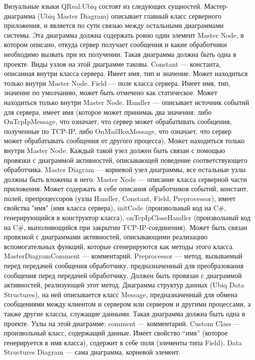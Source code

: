 Визуальные языки QReal:Ubiq состоят из следующих сущностей.
Мастер-диаграмма (Ubiq Master Diagram) описывает главный класс серверного приложения, и является по сути связью между остальными диаграммами системы. Эта диаграмма должна содержать ровно один элемент Master Node, в котором описано, откуда сервер получает сообщения и какие обработчики необходимо вызвать при их получении. Такая диаграмма должна быть одна в проекте. Виды узлов на этой диаграмме таковы.
Constant --- константа, описанная внутри класса сервера. Имеет имя, тип и значение. Может находиться только внутри Master Node.
Field --- поле класса сервера. Имеет имя, тип, значение по умолчанию, может быть отмечено как статическое. Может находиться только внутри Master Node.
Handler --- описывает источник событий для сервера, имеет имя (которое может принимаь два значения: либо OnTcpIpMessage, что означает, что сервер может обрабатывать сообщения, полученные по TCP-IP, либо OnMailBoxMessage, что означает, что сервер может обрабатывать сообщения от другого процесса). Может находиться только внутри Master Node. Каждый такой узел должен быть связан с помощью провязки с диаграммой активностей, описывающей поведение соответствующего обработчика.
Master Diagram --- корневой узел диаграммы, все остальные узлы должны быть вложены в него.
Master Node --- описание класса серверной части приложения. Может содержать в себе описания обработчиков событий, констант, полей, препроцессоров (узлы Handler, Constant, Field, Preprocessor), имеет свойства "имя" (имя класса сервера), initCode (произвольный код на C#, генерирующийся в конструктор класса), onTcpIpCloseHandler (произвольный код на C#, выполняющийся при закрытии TCP-IP-соединения). Может быть связан провязкой с диаграммами активностей, описывающими реализацию вспомогательных функций, которые сгенерируются как методы этого класса.
MasterDiagramComment --- комментарий.
Preprocessor --- метод, вызываемый перед передачей сообщения обработчику, предназначенный для преобразования сообщения перед передачей обработчику. Должен быть провязан с диаграммой активностей, реализующей этот метод.
Диаграмма структур данных (Ubiq Data Structures), на ней описывается класс Message, предназначенный для обмена сообщениями между клиентом и сервером или сервером и другими процессами, а также другие классы, служащие данными. Такая диаграмма должна быть одна в проекте. Узлы на этой диаграмме:
comment --- комментарий.
Custom Class --- произвольный класс, содержащий данные. Имеет свойство “имя” (которое генерируется в имя класса), содержит в себе поля (элементы типа Field).
Data Structures Diagram --- сама диаграмма, корневой элемент.
